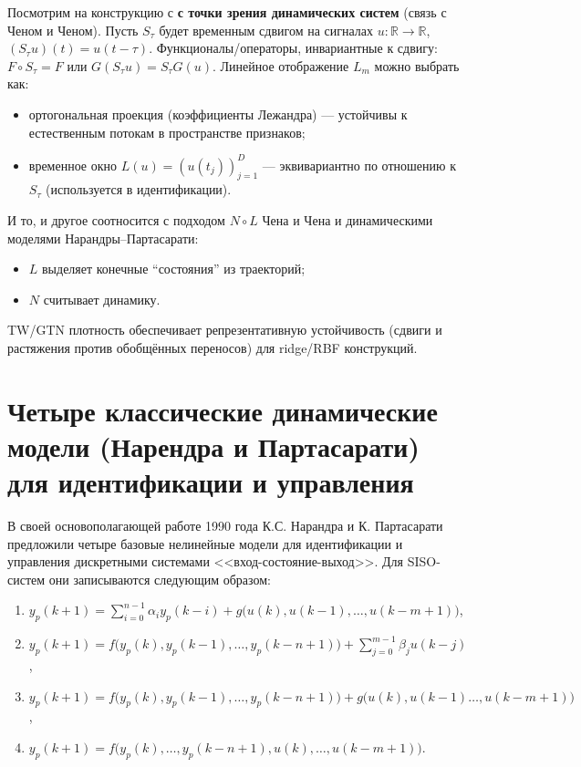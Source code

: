 \documentclass[12pt]{article}
\begin{document}
Посмотрим на конструкцию с \textbf{с точки зрения динамических систем} (связь с Ченом и Ченом).
Пусть \(S_\tau\) будет временным сдвигом на сигналах \(u\colon \mathbb{R} \to \mathbb{R}\), \((S_\tau u)(t) = u(t - \tau)\).
Функционалы/операторы, инвариантные к сдвигу: \(F \circ S_\tau = F\) или \(G(S_\tau u) = S_\tau G(u)\).
Линейное отображение \(L_m\) можно выбрать как:
\begin{itemize}
  \item ортогональная проекция (коэффициенты Лежандра) --- устойчивы к естественным потокам в пространстве признаков;
  \item временное окно \(L(u) = (u(t_j))_{j=1}^D\) --- эквивариантно по отношению к \(S_\tau\) (используется в идентификации).
\end{itemize}
И то, и другое соотносится с подходом \(N \circ L\) Чена и Чена и динамическими моделями Нарандры--Партасарати:
\begin{itemize}
  \item \(L\) выделяет конечные ``состояния'' из траекторий;
  \item \(N\) считывает динамику.
\end{itemize}
TW/GTN плотность обеспечивает репрезентативную устойчивость (сдвиги и растяжения против обобщённых переносов) для ridge/RBF конструкций.


\section{Четыре классические динамические модели (Нарендра и Партасарати) для идентификации и управления}

В своей основополагающей работе 1990 года К.С. Нарандра и К. Партасарати предложили четыре базовые нелинейные модели для идентификации и управления дискретными системами <<вход-состояние-выход>>. Для SISO-систем они записываются следующим образом:
\begin{enumerate}
  \def\labelenumi{\Roman{enumi}.}
  \item \(y_p(k+1) = \sum_{i=0}^{n-1} \alpha_i y_p(k-i) + g\big(u(k), u(k-1), \dots, u(k-m+1)\big)\),
  \item \(y_p(k+1) = f\big(y_p(k), y_p(k-1), \dots, y_p(k-n+1)\big) + \sum_{j=0}^{m-1} \beta_j u(k-j)\),
  \item \(y_p(k+1) = f\big(y_p(k), y_p(k-1), \dots, y_p(k-n+1)\big) + g\big(u(k), u(k-1) \dots, u(k-m+1)\big)\),
  \item \(y_p(k+1) = f\big(y_p(k), \dots, y_p(k-n+1), u(k), \dots, u(k-m+1)\big)\).
\end{enumerate}
\end{document}
